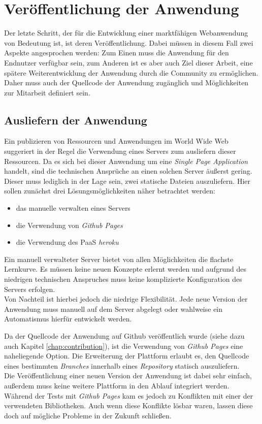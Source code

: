 \chapter{Veröffentlichung der Anwendung}
\thispagestyle{fancy}

Der letzte Schritt, der für die Entwicklung einer marktfähigen Webanwendung von Bedeutung ist, ist deren Veröffentlichung. Dabei müssen in diesem Fall zwei Aspekte angesprochen werden: Zum Einen muss die Anwendung für den Endnutzer verfügbar sein, zum Anderen ist es aber auch Ziel dieser Arbeit, eine spätere Weiterentwicklung der Anwendung durch die Community zu ermöglichen. Daher muss auch der Quellcode der Anwendung zugänglich und Möglichkeiten zur Mitarbeit definiert sein.

\section{Ausliefern der Anwendung}
\label{chap:hosting}
Ein publizieren von Ressourcen und Anwendungen im World Wide Web suggeriert in der Regel die Verwendung eines Servers zum ausliefern dieser Ressourcen. Da es sich bei dieser Anwendung um eine \textit{Single Page Application} handelt, sind die technischen Ansprüche an einen solchen Server äußerst gering. Dieser muss lediglich in der Lage sein, zwei statische Dateien auszuliefern.
Hier sollen zunächst drei Lösungsmöglichkeiten näher betrachtet werden:

\begin{itemize}
  \item das manuelle verwalten eines Servers
  \item die Verwendung von \textit{Github Pages}
  \item die Verwendung des PaaS \textit{heroku}
\end{itemize}

Ein manuell verwalteter Server bietet von allen Möglichkeiten die flachste Lernkurve. Es müssen keine neuen Konzepte erlernt werden und aufgrund des niedrigen technischen Anspruches muss keine komplizierte Konfiguration des Servers erfolgen.\\
Von Nachteil ist hierbei jedoch die niedrige Flexibilität. Jede neue Version der Anwendung muss manuell auf dem Server abgelegt oder wahlweise ein Automatismus hierfür entwickelt werden.

Da der Quellcode der Anwendung auf Github veröffentlich wurde (siehe dazu auch Kapitel \ref{chap:contribution}), ist die Verwendung von \textit{Github Pages} eine naheliegende Option. Die Erweiterung der Plattform erlaubt es, den Quellcode eines bestimmten \textit{Branches} innerhalb eines \textit{Repository} statisch auszuliefern.\\
Die Veröffentlichung einer neuen Version der Anwendung ist dabei sehr einfach, außerdem muss keine weitere Plattform in den Ablauf integriert werden. Während der Tests mit \textit{Github Pages} kam es jedoch zu Konflikten mit einer der verwendeten Bibliotheken. Auch wenn diese Konflikte lösbar waren, lassen diese doch auf mögliche Probleme in der Zukunft schließen.

